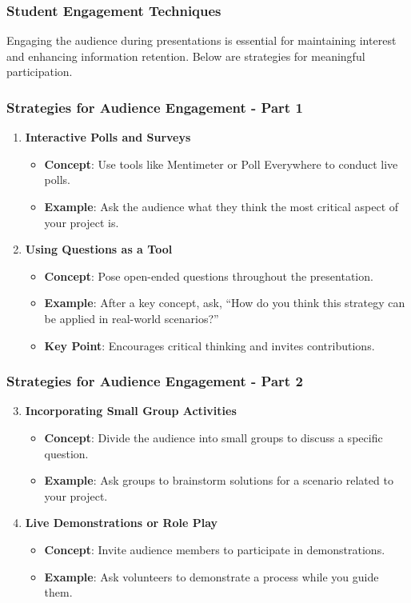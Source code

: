 \documentclass[aspectratio=169]{beamer}
\begin{document}
\begin{frame}[fragile]
    \frametitle{Student Engagement Techniques}
    Engaging the audience during presentations is essential for maintaining interest and enhancing information retention. Below are strategies for meaningful participation.
\end{frame}

\begin{frame}[fragile]
    \frametitle{Strategies for Audience Engagement - Part 1}
    \begin{enumerate}
        \item \textbf{Interactive Polls and Surveys}
            \begin{itemize}
                \item \textbf{Concept}: Use tools like Mentimeter or Poll Everywhere to conduct live polls.
                \item \textbf{Example}: Ask the audience what they think the most critical aspect of your project is.
            \end{itemize}
        \item \textbf{Using Questions as a Tool}
            \begin{itemize}
                \item \textbf{Concept}: Pose open-ended questions throughout the presentation.
                \item \textbf{Example}: After a key concept, ask, “How do you think this strategy can be applied in real-world scenarios?”
                \item \textbf{Key Point}: Encourages critical thinking and invites contributions.
            \end{itemize}
    \end{enumerate}
\end{frame}

\begin{frame}[fragile]
    \frametitle{Strategies for Audience Engagement - Part 2}
    \begin{enumerate}
        \setcounter{enumi}{2}
        \item \textbf{Incorporating Small Group Activities}
            \begin{itemize}
                \item \textbf{Concept}: Divide the audience into small groups to discuss a specific question.
                \item \textbf{Example}: Ask groups to brainstorm solutions for a scenario related to your project.
            \end{itemize}
        \item \textbf{Live Demonstrations or Role Play}
            \begin{itemize}
                \item \textbf{Concept}: Invite audience members to participate in demonstrations.
                \item \textbf{Example}: Ask volunteers to demonstrate a process while you guide them.
            \end{itemize}
    \end{enumerate}
\end{frame}
\end{document}
